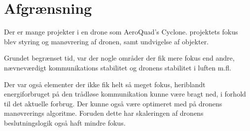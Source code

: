 \documentclass[Main]{subfiles}
\begin{document}
\section{Afgrænsning}
Der er mange projekter i en drone som AeroQuad's Cyclone. 
projektets fokus blev styring og manøvrering af dronen, samt  undvigelse af objekter. 


Grundet begrænset tid, var der nogle områder der fik mere fokus end andre, nævneværdigt kommunikations stabilitet og dronens stabilitet i luften  m.fl. 

Der var også elementer der ikke fik helt så meget fokus, heriblandt energiforbruget på den trådløse kommunikation kunne være bragt ned, i forhold til det aktuelle forbrug. 
Der kunne også være optimeret med på dronens manøvrerings algoritme.
Foruden dette har skaleringen af dronens beslutningslogik også haft mindre fokus.
\end{document}

